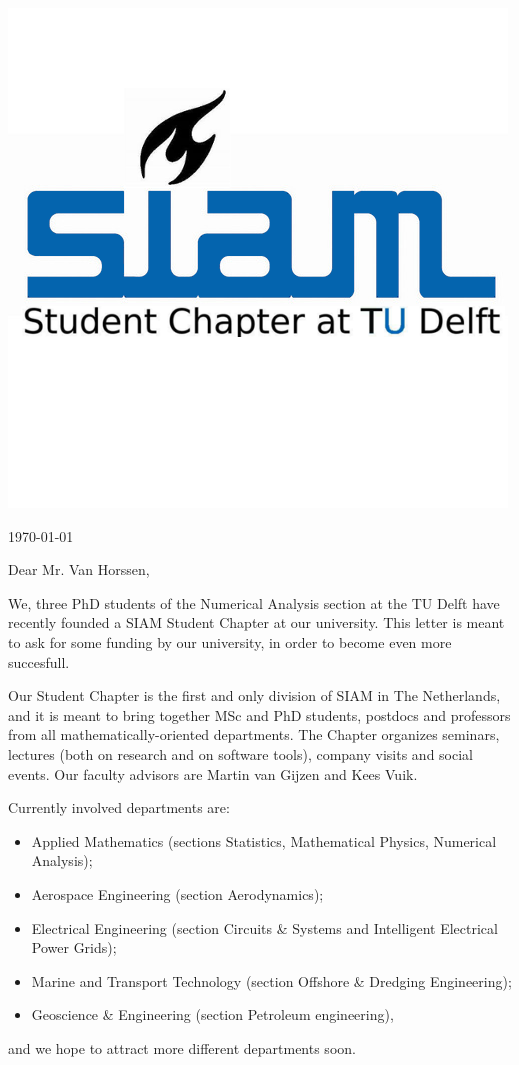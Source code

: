 \documentclass[a4paper,10pt]{article}
\begin{document}
 
\clearpage
\thispagestyle{empty}
\begin{flushright}
 \includegraphics[clip = true, viewport = 0cm 0cm 4.5cm 3.5cm, scale = 1]{SIAMSC_Delft}

\vspace{-1cm}
\today
\end{flushright}


Dear Mr. Van Horssen,

\bigskip
We, three PhD students of the Numerical Analysis section at the TU Delft have recently founded a SIAM Student Chapter at our university. This letter is meant to ask for some funding by our university, in order to become even more succesfull. 

Our Student Chapter is the first and only division of SIAM in The Netherlands, and it is meant to bring together MSc and PhD students, postdocs and professors from all mathematically-oriented departments. The Chapter organizes seminars, lectures (both on research and on software tools), company visits and social events. Our faculty advisors are Martin van Gijzen and Kees Vuik.

\bigskip
Currently involved departments are:
\begin{itemize}
 \item Applied Mathematics (sections Statistics, Mathematical Physics, Numerical Analysis);
 \item Aerospace Engineering (section Aerodynamics);
 \item Electrical Engineering (section Circuits \& Systems and Intelligent Electrical Power Grids);
 \item Marine and Transport Technology (section Offshore \& Dredging Engineering);
 \item Geoscience \& Engineering (section Petroleum engineering),
\end{itemize}
and we hope to attract more different departments soon.
\end{document}
